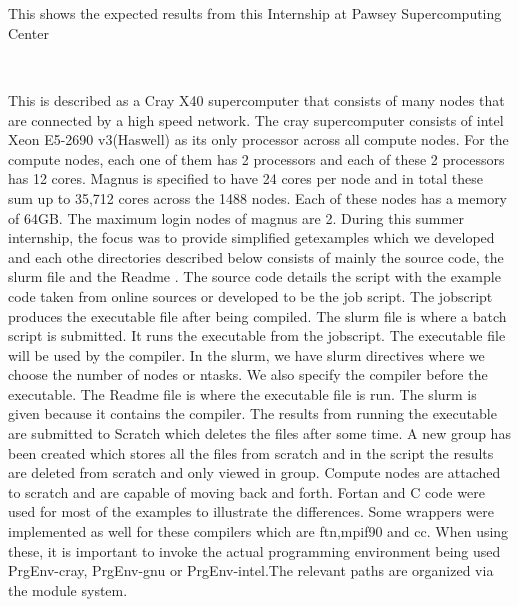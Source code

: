 \begin{Document}

\begin{abstract}




\end{abstract}
\\
\begin{Introduction}




\end{Introduction}
\
\
\\
\begin{scope}

This shows the expected results from this Internship at Pawsey Supercomputing Center
\
\



\end{scope}
\
\\

This is described as a Cray X40 supercomputer that consists of many nodes that are connected by a high speed network. The cray supercomputer consists of intel Xeon E5-2690 v3(Haswell) as its only processor across all compute nodes. For the compute nodes, each one of them has 2 processors and each of these 2 processors has 12 cores.
Magnus is specified to have 24 cores per node and in total these sum up to 35,712 cores across the 1488 nodes. Each of these nodes has a memory of 64GB. The maximum login nodes of magnus are 2.
During this summer internship, the focus was to provide simplified getexamples which we developed and each othe directories described below consists of mainly the source code, the slurm file and the Readme . The source code details the script with the example code taken from online sources or developed to be the job script. The jobscript produces the executable file after being compiled. The slurm file is where a batch script is submitted. It runs the executable from the jobscript. The executable file will be used by the compiler. In the slurm, we have slurm directives where we choose the number of nodes or ntasks. We also specify the compiler before the executable. The Readme file is where the executable file is run. The slurm is given because it contains the compiler. The results from running the executable are submitted to Scratch which deletes the files after some time. A new group has been created which stores all the files from scratch and in the script the results are deleted from scratch and only viewed in group. Compute nodes are attached to scratch and are capable of moving back and forth.
Fortan and C code were used for most of the examples to illustrate the differences. Some wrappers were implemented as well for these compilers which are ftn,mpif90 and cc. When using these, it is important to invoke the actual programming environment being used PrgEnv-cray, PrgEnv-gnu or PrgEnv-intel.The relevant paths are organized via the module system.




\end{Document}
